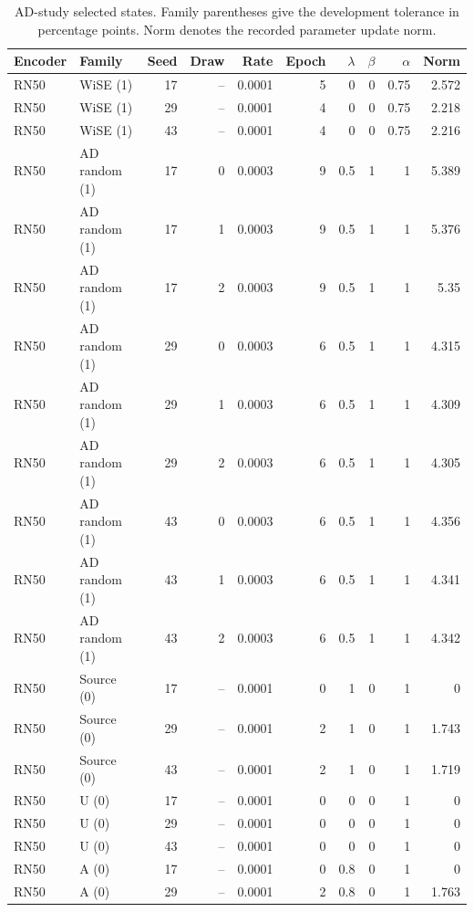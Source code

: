 \begin{table}[t]
\centering
\scriptsize
\setlength{\tabcolsep}{3pt}
\begin{tabular}{llrrrrrrrr}
\toprule
Encoder & Family & Seed & Draw & Rate & Epoch & $\lambda$ & $\beta$ & $\alpha$ & Norm\\
\midrule
RN50 & WiSE (1) & 17 & -- & 0.0001 & 5 & 0 & 0 & 0.75 & 2.572\\
RN50 & WiSE (1) & 29 & -- & 0.0001 & 4 & 0 & 0 & 0.75 & 2.218\\
RN50 & WiSE (1) & 43 & -- & 0.0001 & 4 & 0 & 0 & 0.75 & 2.216\\
RN50 & AD random (1) & 17 & 0 & 0.0003 & 9 & 0.5 & 1 & 1 & 5.389\\
RN50 & AD random (1) & 17 & 1 & 0.0003 & 9 & 0.5 & 1 & 1 & 5.376\\
RN50 & AD random (1) & 17 & 2 & 0.0003 & 9 & 0.5 & 1 & 1 & 5.35\\
RN50 & AD random (1) & 29 & 0 & 0.0003 & 6 & 0.5 & 1 & 1 & 4.315\\
RN50 & AD random (1) & 29 & 1 & 0.0003 & 6 & 0.5 & 1 & 1 & 4.309\\
RN50 & AD random (1) & 29 & 2 & 0.0003 & 6 & 0.5 & 1 & 1 & 4.305\\
RN50 & AD random (1) & 43 & 0 & 0.0003 & 6 & 0.5 & 1 & 1 & 4.356\\
RN50 & AD random (1) & 43 & 1 & 0.0003 & 6 & 0.5 & 1 & 1 & 4.341\\
RN50 & AD random (1) & 43 & 2 & 0.0003 & 6 & 0.5 & 1 & 1 & 4.342\\
RN50 & Source (0) & 17 & -- & 0.0001 & 0 & 1 & 0 & 1 & 0\\
RN50 & Source (0) & 29 & -- & 0.0001 & 2 & 1 & 0 & 1 & 1.743\\
RN50 & Source (0) & 43 & -- & 0.0001 & 2 & 1 & 0 & 1 & 1.719\\
RN50 & U (0) & 17 & -- & 0.0001 & 0 & 0 & 0 & 1 & 0\\
RN50 & U (0) & 29 & -- & 0.0001 & 0 & 0 & 0 & 1 & 0\\
RN50 & U (0) & 43 & -- & 0.0001 & 0 & 0 & 0 & 1 & 0\\
RN50 & A (0) & 17 & -- & 0.0001 & 0 & 0.8 & 0 & 1 & 0\\
RN50 & A (0) & 29 & -- & 0.0001 & 2 & 0.8 & 0 & 1 & 1.763\\
\bottomrule
\end{tabular}
\caption{AD-study selected states. Family parentheses give the development tolerance in percentage points. Norm denotes the recorded parameter update norm.}\label{tab:adselected60}
\end{table}


